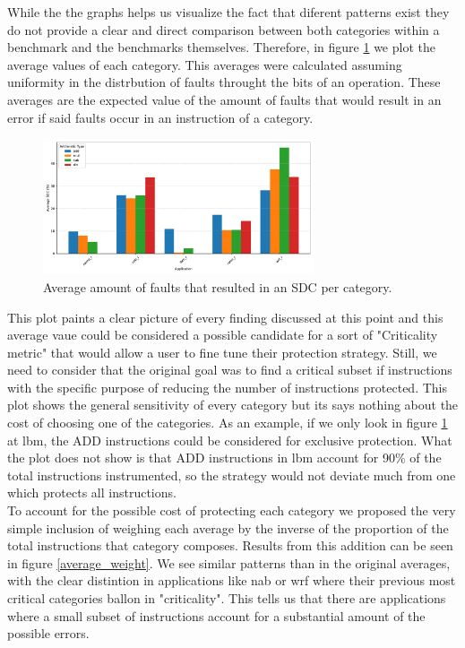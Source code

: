 \documentclass[lettersize,journal]{IEEEtran}
\begin{document}
While the the graphs helps us visualize the fact that diferent patterns exist they do not provide a clear and direct comparison between both categories within a benchmark and the benchmarks themselves. Therefore, in figure \ref{average} we plot the average values of each category. This averages were calculated assuming uniformity in the distrbution of faults throught the bits of an operation. These averages are the expected value of the amount of faults that would result in an error if said faults occur in an instruction of a category.
\begin{figure}[!t] 
    \centering
    \includegraphics[width=8cm]{plots/average_arithmetic/benchmarks_grouped_by_category.pdf}
\caption{Average amount of faults that resulted in an SDC per category.}
\label{average}
\end{figure}
This plot paints a clear picture of every finding discussed at this point and this average vaue could be considered a possible candidate for a sort of "Criticality metric" that would allow a user to fine tune their protection strategy. Still, we need to consider that the original goal was to find a critical subset if instructions with the specific purpose of reducing the number of instructions protected. This plot shows the general sensitivity of every category but its says nothing about the cost of choosing one of the categories. As an example, if we only look in figure \ref{average} at lbm, the ADD instructions could be considered for exclusive protection. What the plot does not show is that ADD instructions in lbm account for 90\% of the total instructions instrumented, so the strategy would not deviate much from one which protects all instructions. \\
To account for the possible cost of protecting each category we proposed the very simple inclusion of weighing each average by the inverse of the proportion of the total instructions that category composes. Results from this addition can be seen in figure \ref{average_weight}. We see similar patterns than in the original averages, with the clear distintion in applications like nab or wrf where their previous most critical categories ballon in "criticality". This tells us that there are applications where a small subset of instructions account for a substantial amount of the possible errors. 
\end{document}
